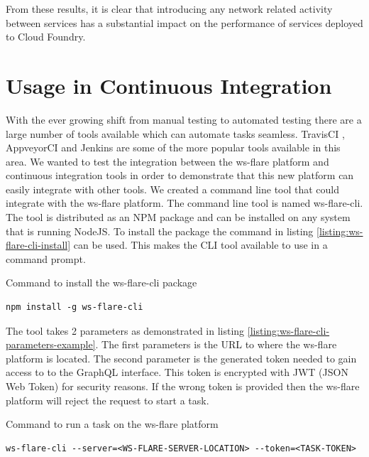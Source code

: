 From these results, it is clear that introducing any network related activity between services has a substantial impact on the performance of services deployed to Cloud Foundry.

\section{Usage in Continuous Integration}

With the ever growing shift from manual testing to automated testing there are a large number of tools available which can automate tasks seamless. TravisCI \cite{travisCI}, AppveyorCI \cite{appveyorCI} and Jenkins \cite{jenkinsCi} are some of the more popular tools available in this area. We wanted to test the integration between the ws-flare platform and continuous integration tools in order to demonstrate that this new platform can easily integrate with other tools. We created a command line tool that could integrate with the ws-flare platform. The command line tool is named ws-flare-cli. The tool is distributed as an NPM package and can be installed on any system that is running NodeJS. To install the package the command in listing \ref{listing:ws-flare-cli-install} can be used. This makes the CLI tool available to use in a command prompt.

\begin{listing}[H]
    \caption{Command to install the ws-flare-cli package}
    \label{listing:ws-flare-cli-install}
    \begin{verbatim}
npm install -g ws-flare-cli
\end{verbatim}
\end{listing}

The tool takes 2 parameters as demonstrated in listing \ref{listing:ws-flare-cli-parameters-example}. The first parameters is the URL to where the ws-flare platform is located. The second parameter is the generated token needed to gain access to to the GraphQL interface. This token is encrypted with JWT (JSON Web Token) for security reasons. If the wrong token is provided then the ws-flare platform will reject the request to start a task.

\begin{listing}[H]
    \caption{Command to run a task on the ws-flare platform}
    \label{listing:ws-flare-cli-parameters-example}
    \begin{verbatim}
ws-flare-cli --server=<WS-FLARE-SERVER-LOCATION> --token=<TASK-TOKEN>
\end{verbatim}
\end{listing}

